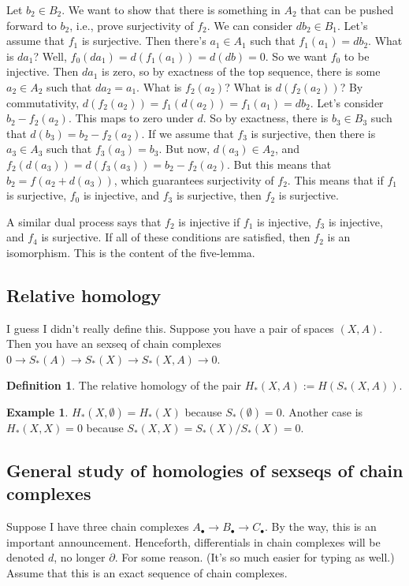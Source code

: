 \documentclass{amsart}
\theoremstyle{theorem}
\theoremstyle{definition}
\newtheorem{definition}[theorem]{Definition}
\newtheorem{example}[theorem]{Example}
\begin{document}
Let $b_2\in B_2$. We want to show that there is something in $A_2$ that can be pushed forward to $b_2$, i.e., prove surjectivity of $f_2$. We can consider $db_2\in B_1$. Let's assume that $f_1$ is surjective. Then there's $a_1\in A_1$ such that $f_1(a_1)=db_2$. What is $da_1$? Well, $f_0(da_1)=d(f_1(a_1))=d(db)=0$. So we want $f_0$ to be injective. Then $da_1$ is zero, so by exactness of the top sequence, there is some $a_2\in A_2$ such that $da_2=a_1$. What is $f_2(a_2)$? What is $d(f_2(a_2))$? By commutativity, $d(f_2(a_2))=f_1(d(a_2))=f_1(a_1)=db_2$. Let's consider $b_2-f_2(a_2)$. This maps to zero under $d$. So by exactness, there is $b_3\in B_3$ such that $d(b_3)=b_2-f_2(a_2)$. If we assume that $f_3$ is surjective, then there is $a_3\in A_3$ such that $f_3(a_3)=b_3$. But now, $d(a_3)\in A_2$, and $f_2(d(a_3))=d(f_3(a_3))=b_2-f_2(a_2)$. But this means that $b_2=f(a_2+d(a_3))$, which guarantees surjectivity of $f_2$. This means that if $f_1$ is surjective, $f_0$ is injective, and $f_3$ is surjective, then $f_2$ is surjective.

A similar dual process says that $f_2$ is injective if $f_1$ is injective, $f_3$ is injective, and $f_4$ is surjective. If all of these conditions are satisfied, then $f_2$ is an isomorphism. This is the content of the five-lemma.
\subsection{Relative homology}
I guess I didn't really define this. Suppose you have a pair of spaces $(X,A)$. Then you have an sexseq of chain complexes $0\to S_\ast(A)\to S_\ast(X)\to S_\ast(X,A)\to 0$. 
\begin{definition}
The relative homology of the pair $ H_\ast(X,A):= H(S_\ast(X,A))$.
\end{definition}
\begin{example}
$ H_\ast(X,\emptyset)= H_\ast(X)$ because $S_\ast(\emptyset)=0$. Another case is $ H_\ast(X,X)=0$ because $S_\ast(X,X)=S_\ast(X)/S_\ast(X)=0$.
\end{example}
\subsection{General study of homologies of sexseqs of chain complexes}
Suppose I have three chain complexes $A_\bullet\to B_\bullet\to C_\bullet$. By the way, this is an important announcement. Henceforth, differentials in chain complexes will be denoted $d$, no longer $\partial$. For some reason. (It's so much easier for typing as well.) Assume that this is an exact sequence of chain complexes.
\end{document}
